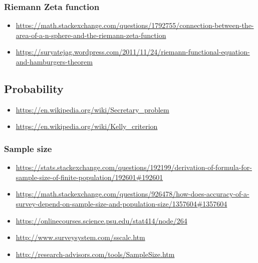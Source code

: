 \subsubsection{Riemann Zeta function}
\begin{itemize}
\item \url{https://math.stackexchange.com/questions/1792755/connection-between-the-area-of-a-n-sphere-and-the-riemann-zeta-function}
\item \url{https://suryatejag.wordpress.com/2011/11/24/riemann-functional-equation-and-hamburgers-theorem}
\end{itemize}


\subsection{Probability}
\begin{itemize}
\item \url{https://en.wikipedia.org/wiki/Secretary_problem}
\item \url{https://en.wikipedia.org/wiki/Kelly_criterion}
\end{itemize}

\subsubsection{Sample size}
\begin{itemize}
\item \url{https://stats.stackexchange.com/questions/192199/derivation-of-formula-for-sample-size-of-finite-population/192601#192601}
\item \url{https://math.stackexchange.com/questions/926478/how-does-accuracy-of-a-survey-depend-on-sample-size-and-population-size/1357604#1357604}
\item \url{https://onlinecourses.science.psu.edu/stat414/node/264}
\item \url{http://www.surveysystem.com/sscalc.htm}
\item \url{http://research-advisors.com/tools/SampleSize.htm}
\end{itemize}


